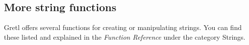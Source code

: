 \subsection{More string functions}

Gretl offers several functions for creating or manipulating
strings. You can find these listed and explained in the
\textit{Function Reference} under the category \textsf{Strings}.
    

